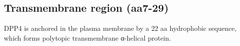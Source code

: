 \subsection{Transmembrane region (aa7-29)}

DPP4 is anchored in the plasma membrane by a 22 aa hydrophobic sequence, which forms \alpha polytopic transmembrane α-helical protein. \cite{Hong_1990}